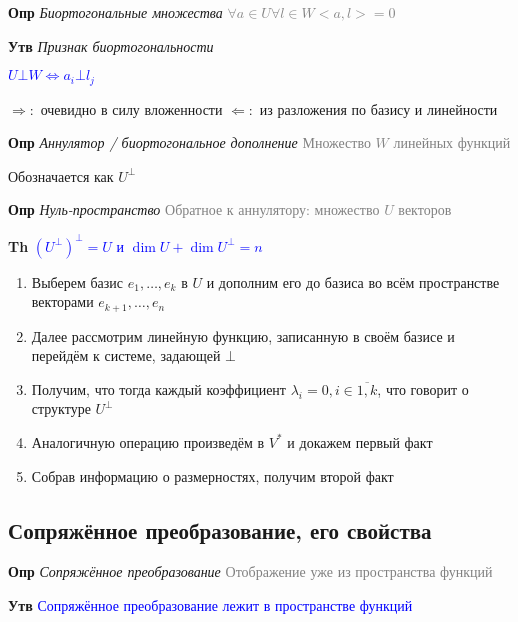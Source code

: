 \documentclass[a4paper, 14pt]{article}
\begin{document}
    \textbf{Опр} \textit{Биортогональные множества} \textcolor{gray}{$\forall a \in U \forall l \in W <a, l> = 0$}

    \textbf{Утв} \textit{Признак биортогональности}

    \textcolor{blue}{$U \bot W \Leftrightarrow a_i \bot l_j$}

    $\Rightarrow:$ очевидно в силу вложенности
    $\Leftarrow:$ из разложения по базису и линейности

    \textbf{Опр} \textit{Аннулятор / биортогональное дополнение} \textcolor{gray}{Множество $W$ линейных функций}

    Обозначается как $U^\bot$


    \textbf{Опр} \textit{Нуль-пространство} \textcolor{gray}{Обратное к аннулятору: множество $U$ векторов}


    \textbf{Th} \textcolor{blue}{$(U^\bot)^\bot = U$ и $\dim U + \dim U^\bot = n$}

    \begin{enumerate}
        \item Выберем базис $e_1, \dots, e_k$ в $U$ и дополним его до базиса во всём пространстве векторами $e_{k+1},
        \dots, e_n$
        \item Далее рассмотрим линейную функцию, записанную в своём базисе и перейдём к системе, задающей $\bot$
        \item Получим, что тогда каждый коэффициент $\lambda_i = 0, i \in \overline{1, k}$, что говорит о структуре $
        U^\bot$
        \item Аналогичную операцию произведём в $V^*$ и докажем первый факт
        \item Собрав информацию о размерностях, получим второй факт
    \end{enumerate}

    \subsection{Сопряжённое преобразование, его свойства}

    \textbf{Опр} \textit{Сопряжённое преобразование} \textcolor{gray}{Отображение уже из пространства функций}

    \textbf{Утв} \textcolor{blue}{Сопряжённое преобразование лежит в пространстве функций}
\end{document}
